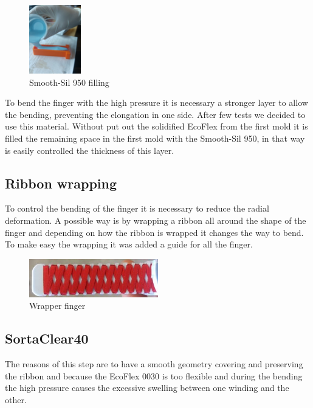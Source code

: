 \documentclass{article}
\begin{document}
\begin{figure}
\centering
    \includegraphics[width=0.2\textwidth]{Pictures/fingerOnToroidal/SmoothSil950filling.jpg}
    \caption{Smooth-Sil 950 filling}
    \label{fig:SmoothSil950filling}
\end{figure}

To bend the finger with the high pressure it is necessary a stronger layer to allow the bending, preventing the elongation in one side.
After few tests we decided to use this material. Without put out the solidified EcoFlex from the first mold it is filled the remaining space in the first mold with the Smooth-Sil 950, in that way is easily controlled the thickness of this layer.


\subsection{Ribbon wrapping}

To control the bending of the finger it is necessary to reduce the radial deformation. A possible way is by wrapping a ribbon all around the shape of the finger and depending on how the ribbon is wrapped it changes the way to bend. To make easy the wrapping it was added a guide for all the finger.

\begin{figure}[h]
	\centering
	\includegraphics[width=0.5\textwidth]{Pictures/fingerOnToroidal/wrappedFinger.jpg}
	\caption{Wrapper finger}
	\label{fig:wrappedFinger}
\end{figure}

\subsection{SortaClear40}
The reasons of this step are to have a smooth geometry covering and preserving the ribbon and because the EcoFlex 0030 is too flexible and during the bending the high pressure causes the excessive swelling between one winding and the other.
\end{document}
